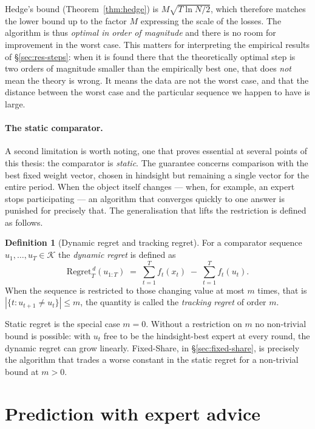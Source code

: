 \documentclass[12pt,a4paper,oneside]{report}
\renewcommand{\_}{\oldunderscore\allowbreak}
\theoremstyle{definition}
\newtheorem{definition}{Definition}[chapter]
\theoremstyle{plain}
\theoremstyle{remark}
\begin{document}
Hedge's bound (Theorem~\ref{thm:hedge}) is $M\sqrt{T\ln N/2}$, which therefore matches the
lower bound up to the factor $M$ expressing the scale of the losses. The algorithm is thus
\emph{optimal in order of magnitude} and there is no room for improvement in the worst case.
This matters for interpreting the empirical results of \S\ref{sec:res-steps}: when it is found
there that the theoretically optimal step is two orders of magnitude smaller than the
empirically best one, that does \emph{not} mean the theory is wrong. It means the data are not
the worst case, and that the distance between the worst case and the particular sequence we
happen to have is large.

\paragraph{The static comparator.} A second limitation is worth noting, one that proves
essential at several points of this thesis: the comparator is \emph{static}. The guarantee
concerns comparison with the best fixed weight vector, chosen in hindsight but remaining a
single vector for the entire period. When the object itself changes --- when, for example, an
expert stops participating --- an algorithm that converges quickly to one answer is punished
for precisely that. The generalisation that lifts the restriction is defined as follows.

\begin{definition}[Dynamic regret and tracking regret]
\label{def:dynamic-regret}
For a comparator sequence $u_1,\dots,u_T \in \mathcal{K}$ the \emph{dynamic regret} is defined
as
\[
\mathrm{Regret}_T^{\,d}(u_{1:T}) \;=\; \sum_{t=1}^{T} f_t(x_t) \;-\; \sum_{t=1}^{T} f_t(u_t).
\]
When the sequence is restricted to those changing value at most $m$ times, that is
$|\{t : u_{t+1}\neq u_t\}| \leq m$, the quantity is called the \emph{tracking regret} of order
$m$.
\end{definition}

Static regret is the special case $m=0$. Without a restriction on $m$ no non-trivial bound is
possible: with $u_t$ free to be the hindsight-best expert at every round, the dynamic regret
can grow linearly. Fixed-Share, in \S\ref{sec:fixed-share}, is precisely the algorithm that
trades a worse constant in the static regret for a non-trivial bound at $m>0$.

\section{Prediction with expert advice}
\end{document}
